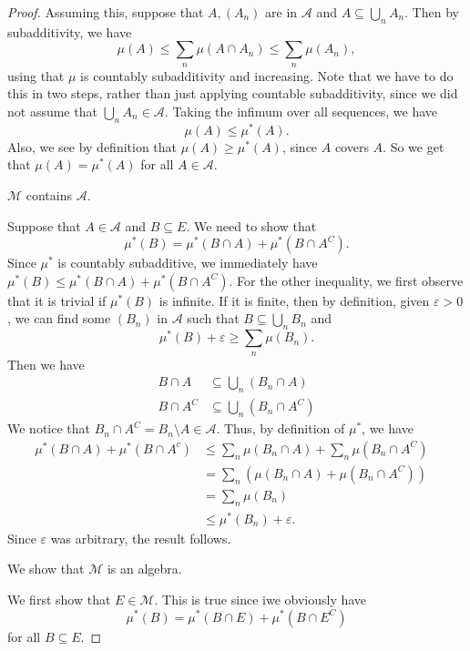 \documentclass[a4paper]{article}
\begin{document}
\begin{proof}
  Assuming this, suppose that $A, (A_n)$ are in $\mathcal{A}$ and $A \subseteq \bigcup_n A_n$. Then by subadditivity, we have
  \[
    \mu(A) \leq \sum_n \mu(A \cap A_n) \leq \sum_n \mu(A_n),
  \]
  using that $\mu$ is countably subadditivity and increasing. Note that we have to do this in two steps, rather than just applying countable subadditivity, since we did not assume that $\bigcup_n A_n \in \mathcal{A}$. Taking the infimum over all sequences, we have
  \[
    \mu(A) \leq \mu^*(A).
  \]
  Also, we see by definition that $\mu(A) \geq \mu^*(A)$, since $A$ covers $A$. So we get that $\mu(A) = \mu^*(A)$ for all $A \in \mathcal{A}$.

  \begin{claim}
    $\mathcal{M}$ contains $\mathcal{A}$.
  \end{claim}
  Suppose that $A \in \mathcal{A}$ and $B \subseteq E$. We need to show that
  \[
    \mu^*(B) = \mu^*(B \cap A) + \mu^*(B \cap A^C).
  \]
  Since $\mu^*$ is countably subadditive, we immediately have $\mu^*(B) \leq \mu^*(B \cap A) + \mu^*(B \cap A^C)$. For the other inequality, we first observe that it is trivial if $\mu^*(B)$ is infinite. If it is finite, then by definition, given $\varepsilon > 0$, we can find some $(B_n)$ in $\mathcal{A}$ such that $B \subseteq \bigcup_n B_n$ and
  \[
    \mu^*(B) + \varepsilon \geq \sum_n \mu(B_n).
  \]
  Then we have
  \begin{align*}
    B \cap A &\subseteq \bigcup_n (B_n \cap A)\\
    B \cap A^C &\subseteq \bigcup_n (B_n \cap A^C)
  \end{align*}
  We notice that $B_n \cap A^C = B_n \setminus A \in \mathcal{A}$. Thus, by definition of $\mu^*$, we have
  \begin{align*}
    \mu^* (B \cap A) + \mu^*(B \cap A^c) &\leq \sum_n \mu(B_n \cap A) + \sum_n \mu(B_n \cap A^C)\\
    &= \sum_n (\mu(B_n \cap A) + \mu(B_n \cap A^C))\\
    &= \sum_n \mu(B_n) &\\
    &\leq \mu^*(B_n) + \varepsilon.
  \end{align*}
  Since $\varepsilon$ was arbitrary, the result follows.

  \begin{claim}
    We show that $\mathcal{M}$ is an algebra.
  \end{claim}
  We first show that $E \in \mathcal{M}$. This is true since iwe obviously have
  \[
    \mu^*(B) = \mu^*(B \cap E) + \mu^*(B \cap E^C)
  \]
  for all $B \subseteq E$.


\end{proof}
\end{document}
